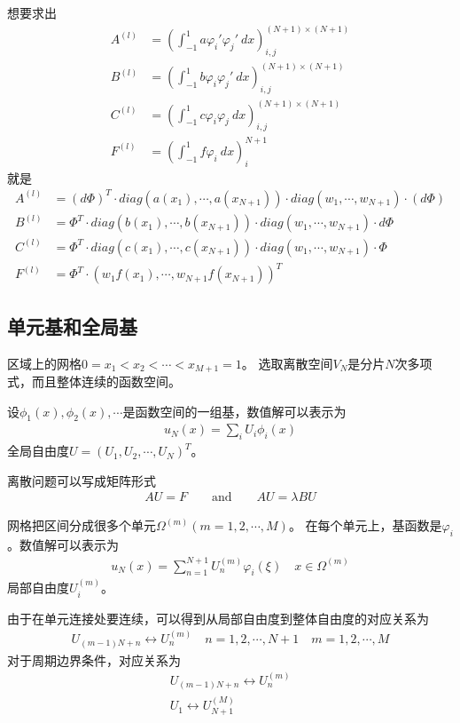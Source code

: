 \documentclass[12pt,a4paper]{article}
\begin{document}
想要求出
\begin{align*}
A^{(l)} & = (\int_{-1}^{1} a \varphi_i' \varphi_j' \ dx)_{i,j}^{(N+1) \times (N+1)} \\
B^{(l)} & = (\int_{-1}^{1} b \varphi_i \varphi_j' \ dx)_{i,j}^{(N+1) \times (N+1)} \\
C^{(l)} & = (\int_{-1}^{1} c \varphi_i \varphi_j \ dx)_{i,j}^{(N+1) \times (N+1)} \\
F^{(l)} & = (\int_{-1}^{1} f \varphi_i \ dx)_{i}^{N+1}
\end{align*}
就是
\begin{align*}
A^{(l)} & = (d\Phi)^T \cdot diag(a(x_1), \cdots, a(x_{N+1})) \cdot diag(w_1, \cdots, w_{N+1}) \cdot (d\Phi) \\
B^{(l)} & = \Phi^T \cdot diag(b(x_1), \cdots, b(x_{N+1})) \cdot diag(w_1, \cdots, w_{N+1}) \cdot d\Phi \\
C^{(l)} & = \Phi^T \cdot diag(c(x_1), \cdots, c(x_{N+1})) \cdot diag(w_1, \cdots, w_{N+1}) \cdot \Phi \\
F^{(l)} & = \Phi^T \cdot (w_1 f(x_1), \cdots, w_{N+1} f(x_{N+1}))^T
\end{align*}

\subsection{单元基和全局基}

区域上的网格$0 = x_1 < x_2 < \cdots < x_{M+1} = 1$。
选取离散空间$V_N$是分片$N$次多项式，而且整体连续的函数空间。

设$\phi_1(x), \phi_2(x), \cdots$是函数空间的一组基，数值解可以表示为
\begin{align*}
u_N(x) = \sum_{i} U_i \phi_{i}(x)
\end{align*}
全局自由度$U = (U_1, U_2, \cdots, U_N)^T$。

离散问题可以写成矩阵形式
\begin{align*}
A U = F \qquad \text{and} \qquad A U = \lambda B U
\end{align*}

网格把区间分成很多个单元$\Omega^{(m)} (m = 1,2,\cdots,M)$。
在每个单元上，基函数是$\varphi_i$。数值解可以表示为
\begin{align*}
u_N(x) = \sum_{n=1}^{N+1} U_n^{(m)} \varphi_i(\xi) \quad x \in \Omega^{(m)}
\end{align*}
局部自由度$U_i^{(m)}$。

由于在单元连接处要连续，可以得到从局部自由度到整体自由度的对应关系为
\begin{align*}
U_{(m-1)N + n} \leftrightarrow U_n^{(m)} \quad n = 1,2,\cdots,N+1 \quad m = 1,2,\cdots,M 
\end{align*}
对于周期边界条件，对应关系为
\begin{align*}
U_{(m-1)N + n} \leftrightarrow U_n^{(m)} \\
U_{1} \leftrightarrow U_{N+1}^{(M)} 
\end{align*}
\end{document}
